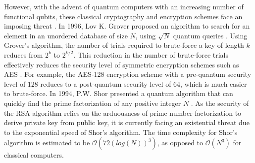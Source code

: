 \documentclass[a4paper]{cas-sc}
\begin{document}
However, with the advent of quantum computers with an increasing number of functional qubits, these classical cryptography and encryption schemes face an imposing threat \cite{bernstein2017post}. In 1996, Lov K. Grover proposed an algorithm to search for an element in an unordered database of size $N$, using $\sqrt{N}$ quantum queries \cite{grover1996fast}. Using Grover's algorithm, the number of trials required to brute-force a key of length $k$ reduces from $2^{k}$ to $2^{k/2}$. This reduction in the number of brute-force trials effectively reduces the security level of symmetric encryption schemes such as AES \cite{Daemen2002}. For example, the AES-128 encryption scheme with a pre-quantum security level of 128 reduces to a post-quantum security level of 64, which is much easier to brute-force. In 1994, P.W. Shor presented a quantum algorithm that can quickly find the prime factorization of any positive integer $N$ \cite{Shor1997}. As the security of the RSA algorithm relies on the arduousness of prime number factorization to derive private key from public key, it is currently facing an existential threat due to the exponential speed of Shor's algorithm. The time complexity for Shor's algorithm is estimated to be $\mathcal{O}(72(log(N))^{3})$, as opposed to $\mathcal{O}(N^3)$ for classical computers.
\end{document}
